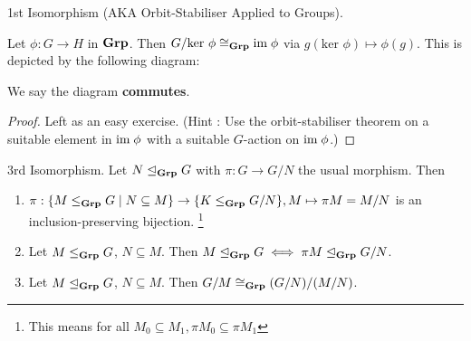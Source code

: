 \documentclass[../book.tex]{subfiles}
\begin{document}
\begin{thm} 1st Isomorphism (AKA Orbit-Stabiliser Applied to Groups). 
    
    Let $\phi : G \to H$ in $\mathbf{Grp}$. 
    Then $G / \text{ker } \phi \cong_{\mathbf{Grp}} \textnormal{im}\; \phi$ 
    via $g(\text{ker }\phi) \mapsto \phi(g)$.
    This is depicted by the following diagram:
    \begin{figure}[ht]
        \centering
    \end{figure}
    We say the diagram \textbf{commutes}. 
\end{thm}
\begin{proof}
    Left as an easy exercise. 
    (Hint : Use the orbit-stabiliser theorem
    on a suitable element in $\textnormal{im}\; \phi$ with a suitable $G$-action on $\textnormal{im}\; \phi$.)
\end{proof}
\begin{thm} 3rd Isomorphism. 
    Let $N \trianglelefteq_{\mathbf{Grp}} G$ with $\pi : G \to G/N$ the usual morphism. Then
    \begin{enumerate}
        \item $\pi : 
        \{M \leq_{\mathbf{Grp}} G \mid N \subseteq M\} \to \{K \leq_{\mathbf{Grp}} G/N\}, 
        M \mapsto \pi M = M/N$ is an inclusion-preserving bijection.
        \footnote{This means for all $M_0\subseteq M_1,
        \pi M_0 \subseteq \pi M_1$}
        \item Let $M \leq_{\mathbf{Grp}} G$, $N \subseteq M$. 
        Then $M \trianglelefteq_{\mathbf{Grp}} G \iff \pi M \trianglelefteq_{\mathbf{Grp}} G/N$. 
        \item Let $M \trianglelefteq_{\mathbf{Grp}} G$, $N \subseteq M$. 
        Then $G / M \cong_{\mathbf{Grp}} (G / N) / (M / N)$. 
    \end{enumerate}
    
\end{thm}
\end{document}
